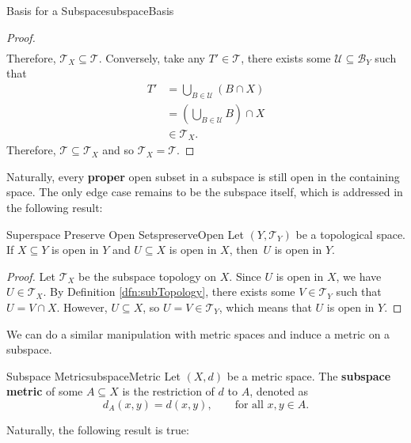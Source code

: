 \documentclass[math]{amznotes}
\theoremstyle{remark}
\begin{document}
\begin{probox}{Basis for a Subspace}{subspaceBasis}
\begin{proof}
\begin{align*}
        \end{align*}
        Therefore, $\mathcal{T}_X \subseteq \mathcal{T}$. Conversely, take any $T' \in \mathcal{T}$, there exists some $\mathcal{U} \subseteq \mathcal{B}_Y$ such that
        \begin{align*}
            T' & = \bigcup_{B \in \mathcal{U}}\left(B \cap X\right) \\
            & = \left(\bigcup_{B \in \mathcal{U}}B\right) \cap X \\
            & \in \mathcal{T}_X.
        \end{align*}
        Therefore, $\mathcal{T} \subseteq \mathcal{T}_X$ and so $\mathcal{T}_X = \mathcal{T}$.
    \end{proof}
\end{probox}
Naturally, every \textbf{proper} open subset in a subspace is still open in the containing space. The only edge case remains to be the subspace itself, which is addressed in the following result:
\begin{probox}{Superspace Preserve Open Sets}{preserveOpen}
    Let $\left(Y, \mathcal{T}_Y\right)$ be a topological space. If $X \subseteq Y$ is open in $Y$ and $U \subseteq X$ is open in $X$, then~$U$ is open in $Y$.
    \tcblower
    \begin{proof}
        Let $\mathcal{T}_X$ be the subspace topology on $X$. Since $U$ is open in $X$, we have $U \in \mathcal{T}_X$. By Definition \ref{dfn:subTopology}, there exists some $V \in \mathcal{T}_Y$ such that $U = V \cap X$. However, $U \subseteq X$, so $U = V \in \mathcal{T}_Y$, which means that $U$ is open in $Y$.
    \end{proof}
\end{probox}
We can do a similar manipulation with metric spaces and induce a metric on a subspace.
\begin{dfnbox}{Subspace Metric}{subspaceMetric}
    Let $\left(X, d\right)$ be a metric space. The {\color{red} \textbf{subspace metric}} of some $A \subseteq X$ is the restriction of $d$ to $A$, denoted as 
    \begin{equation*}
        d_A\left(x, y\right) = d\left(x, y\right), \qquad \textrm{for all } x, y \in A.
    \end{equation*}
\end{dfnbox}
Naturally, the following result is true:
\end{document}
